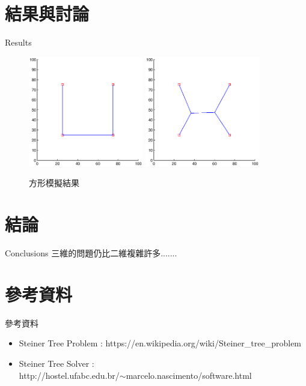 \documentclass[11pt]{beamer}
\begin{document}
\section{結果與討論}
\begin{frame}{Results}
\begin{figure}[h]
\centering

\includegraphics[width=5cm]{square1}\hfill
\includegraphics[width=5cm]{square2}
\caption{方形模擬結果}
\end{figure}
\end{frame}

\section{結論}
\begin{frame}{Conclusions}
三維的問題仍比二維複雜許多.......\\
\quad {}
\end{frame}

\section{參考資料}
\begin{frame}{參考資料}
\begin{itemize}
\item Steiner Tree Problem : https://en.wikipedia.org/wiki/Steiner\_tree\_problem
\item Steiner Tree Solver : \\ http://hostel.ufabc.edu.br/$\sim$marcelo.nascimento/software.html
\end{itemize}

\end{frame}
\end{document}
